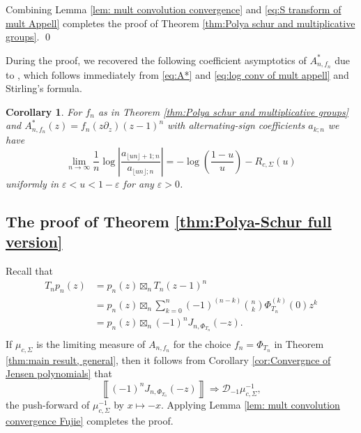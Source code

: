 \documentclass[reqno]{amsart}
\newcommand{\1}{\mathbf{1}}
\theoremstyle{plain}
\newtheorem{corollary}[theorem]{Corollary}
\theoremstyle{definition}
\theoremstyle{remark}
\numberwithin{equation}{section}
\begin{document}
	Combining Lemma \ref{lem: mult convolution convergence} and \eqref{eq:S transform of mult Appell} completes the proof of Theorem \ref{thm:Polya schur and multiplicative groups}.  \qed 
	
	During the proof, we recovered the following coefficient asymptotics of $A_{n,f_n}^{*}$ due to  \cite{Jalowy-Kabluchko-Marynych2025,Arizmendi-Fujie-Perales-Ueda2024}, which follows immediately from \eqref{eq:A*} and \eqref{eq:log conv of mult appell} and Stirling's formula. 
	\begin{corollary}
		For $f_n$ as in Theorem \ref{thm:Polya schur and multiplicative groups} and $A_{n,f_n}^{*}(z)= f_n(z\partial_{z})(z-1)^{n}$ with alternating-sign coefficients $a_{k;n}$ we have
		$$\lim_{n\to\infty}\frac 1 n \log \left\lvert\frac{a_{\lfloor un \rfloor+1;n}}{a_{\lfloor un \rfloor;n}}\right\rvert=-\log\left(\frac{1-u}{u}\right)-R_{c,\Sigma}(u)
		$$
		 uniformly in $\varepsilon<u<1-\varepsilon$ for any $\varepsilon>0$.
	\end{corollary}
	
	\subsection{The proof of Theorem \ref{thm:Polya-Schur full version}}   Recall that \begin{equation*}
	\begin{aligned}
			T_np_n(z)&=p_n(z)\boxtimes_{n}T_n(z-1)^{n}\\
						  &=p_n(z)\boxtimes_{n}\sum_{k=0}^{n}(-1)^{(n-k)}\binom{n}{k}\Phi_{T_n}^{(k)}(0)z^{k}\\
						  &=p_n(z)\boxtimes_{n}(-1)^{n}J_{n,\Phi_{T_n}}(-z).\\
	\end{aligned}
	\end{equation*} If $\mu_{c,\Sigma}$ is the limiting measure of $A_{n,f_n}$ for the choice $f_n=\Phi_{T_n}$ in Theorem \ref{thm:main result, general}, then it follows from Corollary \ref{cor:Convergnce of Jensen polynomials} that \begin{equation}
	\left\llbracket (-1)^{n}J_{n,\Phi_{T_n}}(-z) \right\rrbracket\Rightarrow \mathcal{D}_{-1}\mu_{c,\Sigma}^{-1},
	\end{equation} the push-forward of $\mu_{c,\Sigma}^{-1}$ by $x\mapsto -x$. Applying Lemma \ref{lem: mult convolution convergence Fujie} completes the proof.  
	
\end{document}
